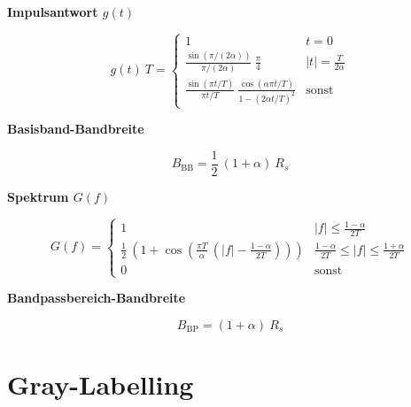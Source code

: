 \documentclass[a4paper, 11pt]{article}
\newcommand{\fancyformula}[2]{
        \small
        \raggedright{\sffamily\textbf{#1}}
        #2
}
\begin{document}
\begin{multicols}{2}
	\fancyformula{Impulsantwort $g(t)$}{
		\[
			g(t) ~ T= \begin{cases}
				1 & t = 0 \\
				\frac{\sin(\pi / (2 \alpha))}{\pi / (2 \alpha)} ~ \frac{\pi}{4} & |t| = \frac{T}{2 \alpha} \\
				\frac{\sin(\pi t / T)}{\pi t / T} ~ \frac{\cos(\alpha \pi t / T)}{1 - (2 \alpha t / T)^2} & \text{sonst}
			\end{cases}
		\]
	}

	\fancyformula{Basisband-Bandbreite}{
		\[
			B_{\mathrm{BB}} = \frac{1}{2} ~ (1 + \alpha) ~ R_s
		\]
	}

	\fancyformula{Spektrum $G(f)$}{
		\[
			G(f) = \begin{cases}
				1 & |f| \leq \frac{1 - \alpha}{2T} \\
				\frac{1}{2} ~ \left(1 + \cos \left(\frac{\pi T}{\alpha} ~ (|f| - \frac{1 - \alpha}{2 T}) \right) \right) & \frac{1 - \alpha}{2 T} \leq |f| \leq \frac{1 + \alpha}{2 T} \\
				0 & \text{sonst}
			\end{cases}
		\]
	}

	\fancyformula{Bandpassbereich-Bandbreite}{
		\[
			B_{\mathrm{BP}} = (1 + \alpha) ~ R_s
		\]
	}
\end{multicols}


\section*{Gray-Labelling}
\end{document}
